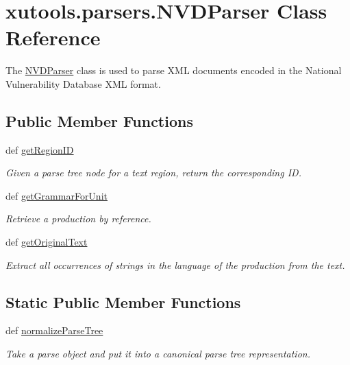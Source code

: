 \hypertarget{classxutools_1_1parsers_1_1_n_v_d_parser}{\section{xutools.\-parsers.\-N\-V\-D\-Parser Class Reference}
\label{classxutools_1_1parsers_1_1_n_v_d_parser}
}


The \hyperlink{classxutools_1_1parsers_1_1_n_v_d_parser}{N\-V\-D\-Parser} class is used to parse X\-M\-L documents encoded in the National Vulnerability Database X\-M\-L format.  


\subsection*{Public Member Functions}
\begin{DoxyCompactItemize}
\item 
def \hyperlink{classxutools_1_1parsers_1_1_n_v_d_parser_a5cf1a020dc3a50c656baef8c6c2febff}{get\-Region\-I\-D}
\begin{DoxyCompactList}\small\item\em Given a parse tree node for a text region, return the corresponding I\-D. \end{DoxyCompactList}\item 
def \hyperlink{classxutools_1_1parsers_1_1_n_v_d_parser_a52524f7b32f126d1931b5c72b78c9d0a}{get\-Grammar\-For\-Unit}
\begin{DoxyCompactList}\small\item\em Retrieve a production by reference. \end{DoxyCompactList}\item 
def \hyperlink{classxutools_1_1parsers_1_1_n_v_d_parser_aab570bb515100eefaa7cc50529f38573}{get\-Original\-Text}
\begin{DoxyCompactList}\small\item\em Extract all occurrences of strings in the language of the production from the text. \end{DoxyCompactList}\end{DoxyCompactItemize}
\subsection*{Static Public Member Functions}
\begin{DoxyCompactItemize}
\item 
def \hyperlink{classxutools_1_1parsers_1_1_n_v_d_parser_a4eb9c2d54788e4247f77fc797096ece1}{normalize\-Parse\-Tree}
\begin{DoxyCompactList}\small\item\em Take a parse object and put it into a canonical parse tree representation. \end{DoxyCompactList}\end{DoxyCompactItemize}
